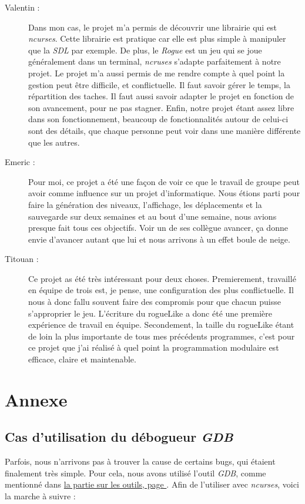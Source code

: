 \documentclass[11pt]{report}
\begin{document}
	\begin{description}
	\item[Valentin :] Dans mon cas, le projet m'a permis de découvrir une librairie qui est \emph{ncurses}. Cette librairie est pratique car elle est plus simple à manipuler que la \emph{SDL} par exemple. De plus, le \emph{Rogue} est un jeu qui se joue généralement dans un terminal, \emph{ncruses} s'adapte parfaitement à notre projet. Le projet m'a aussi permis de me rendre compte à quel point la gestion peut être difficile, et conflictuelle. Il faut savoir gérer le temps, la répartition des taches. Il faut aussi savoir adapter le projet en fonction de son avancement, pour ne pas stagner. Enfin, notre projet étant assez libre dans son fonctionnement, beaucoup de fonctionnalités autour de celui-ci sont des détails, que chaque personne peut voir dans une manière différente que les autres. 
	\item[Emeric :] Pour moi, ce projet a été une façon de voir ce que le travail de groupe peut avoir comme influence sur un projet d'informatique. Nous étions parti pour faire la génération des niveaux, l'affichage, les déplacements et la sauvegarde sur deux semaines et au bout d'une semaine, nous avions presque fait tous ces objectifs. Voir un de ses collègue avancer, ça donne envie d'avancer autant que lui et nous arrivons à un effet boule de neige.
	\item[Titouan :] Ce projet as été très intéressant pour deux choses. Premierement, travaillé en équipe de trois est, je pense, une configuration des plus conflictuelle. Il nous à donc fallu souvent faire des compromis pour que chacun puisse s'approprier le jeu. L'écriture du rogueLike a donc été une première expérience de travail en équipe. Secondement, la taille du rogueLike étant de loin la plus importante de tous mes précédents programmes, c'est pour ce projet que j'ai réalisé à quel point la programmation modulaire est efficace, claire et maintenable.
	\end{description}

\chapter*{Annexe}

	\section*{Cas d'utilisation du débogueur \emph{GDB}}
	
		Parfois, nous n'arrivons pas à trouver la cause de certains bugs, qui étaient finalement très simple. Pour cela, nous avons utilisé l'outil \emph{GDB}, comme mentionné dans \hyperref[gdb]{la partie sur les outils, page }. Afin de l'utiliser avec \emph{ncurses}, voici la marche à suivre :
		
\end{document}
